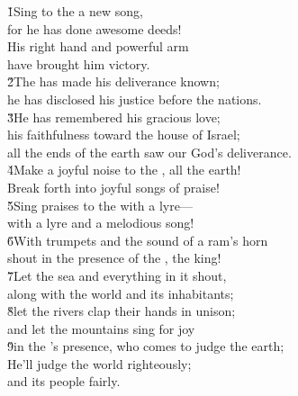 \begin{poetry}
\poeml \v{1}Sing to the  a new song, \\
\poemll    for he has done awesome deeds! \\
\poeml His right hand and powerful arm \\
\poemll    have brought him victory. \\
\poeml \v{2}The  has made his deliverance known; \\
\poemll    he has disclosed his justice before the nations. \\
\poeml \v{3}He has remembered his gracious love; \\
\poemll    his faithfulness toward the house of Israel; \\
\poemlll       all the ends of the earth saw our God's deliverance. \\
\poeml \v{4}Make a joyful noise to the , all the earth! \\
\poemll    Break forth into joyful songs of praise! \\
\poeml \v{5}Sing praises to the  with a lyre--- \\
\poemll    with a lyre and a melodious song! \\
\poeml \v{6}With trumpets and the sound of a ram's horn \\
\poemll    shout in the presence of the , the king! \\
\poeml \v{7}Let the sea and everything in it shout, \\
\poemll    along with the world and its inhabitants; \\
\poeml \v{8}let the rivers clap their hands in unison; \\
\poemll    and let the mountains sing for joy \\
\poeml \v{9}in the 's presence, who comes to judge the earth; \\
\poeml He'll judge the world righteously; \\
\poemll    and its people fairly.
\end{poetry}

